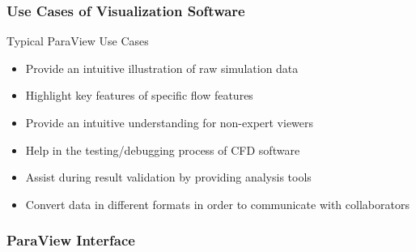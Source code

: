 \begin{frame}
  \frametitle{Use Cases of Visualization Software}

      \begin{block}{Typical ParaView Use Cases}
        \begin{itemize}
          \item Provide an intuitive illustration of raw simulation data

          \item Highlight key features of specific flow features

          \item Provide an intuitive understanding for non-expert viewers  

          \item Help in the testing/debugging process of CFD software 

          \item Assist during result validation by providing analysis tools  

          \item Convert data in different formats in order to communicate with collaborators
        \end{itemize}
      \end{block}

\end{frame}

\begin{frame}
  \frametitle{ParaView Interface}


\end{frame}

